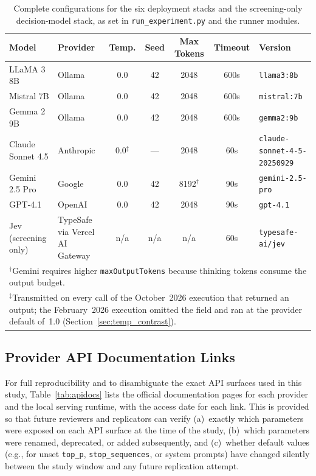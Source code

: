 \documentclass[11pt]{article}
\newenvironment{fittab}{\begin{lrbox}{\fittabbox}}{\end{lrbox}%
  \ifdim\wd\fittabbox>\linewidth\resizebox{\linewidth}{!}{\usebox{\fittabbox}}\else\usebox{\fittabbox}\fi}
\begin{document}
\begin{table}[htbp]
\centering
\caption{Complete configurations for the six deployment stacks and the screening-only decision-model stack, as set in \texttt{run\_experiment.py} and the runner modules.}
\small
\begin{fittab}\begin{tabular}{llccccl}
\toprule
\textbf{Model} & \textbf{Provider} & \textbf{Temp.} & \textbf{Seed} & \textbf{Max Tokens} & \textbf{Timeout} & \textbf{Version} \\
\midrule
LLaMA 3 8B     & Ollama   & 0.0 & 42   & 2048  & 600s & \texttt{llama3:8b} \\
Mistral 7B     & Ollama   & 0.0 & 42   & 2048  & 600s & \texttt{mistral:7b} \\
Gemma 2 9B     & Ollama   & 0.0 & 42   & 2048  & 600s & \texttt{gemma2:9b} \\
\midrule
Claude Sonnet 4.5 & Anthropic & 0.0$^\ddagger$ & --- & 2048 & 60s & \texttt{claude-sonnet-4-5-20250929} \\
Gemini 2.5 Pro & Google   & 0.0 & 42   & 8192$^\dagger$ & 90s & \texttt{gemini-2.5-pro} \\
GPT-4.1        & OpenAI   & 0.0 & 42   & 2048  & 90s & \texttt{gpt-4.1} \\
\midrule
Jev (screening only) & TypeSafe via Vercel AI Gateway & n/a & n/a & n/a & 60s & \texttt{typesafe-ai/jev} \\
\bottomrule
\multicolumn{7}{l}{\footnotesize $^\dagger$Gemini requires higher \texttt{maxOutputTokens} because thinking tokens consume the output budget.}\\
\multicolumn{7}{p{0.95\textwidth}}{\footnotesize $^\ddagger$Transmitted on every call of the October~2026 execution that returned an output; the February~2026 execution omitted the field and ran at the provider default of~1.0 (Section~\ref{sec:temp_contrast}).}
\end{tabular}\end{fittab}
\end{table}

\subsection{Provider API Documentation Links}
\label{sec:apidocs}

For full reproducibility and to disambiguate the exact API surfaces used in this study, Table~\ref{tab:apidocs} lists the official documentation pages for each provider and the local serving runtime, with the access date for each link.
This is provided so that future reviewers and replicators can verify (a)~exactly which parameters were exposed on each API surface at the time of the study, (b)~which parameters were renamed, deprecated, or added subsequently, and (c)~whether default values (e.g., for unset \texttt{top\_p}, \texttt{stop\_sequences}, or system prompts) have changed silently between the study window and any future replication attempt.
\end{document}
